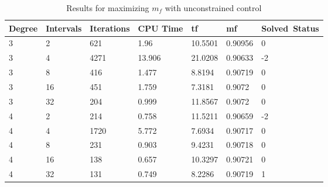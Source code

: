 \documentclass[]{article}
\begin{document}
\begin{table}
	\begin{tabular}{lllllll}
		Degree & Intervals & Iterations & CPU Time & tf & mf & Solved\ Status \\ 
		\hline 
		3 & 2 & 621 & 1.96 & 10.5501 & 0.90956 & 0 \\ 
		3 & 4 & 4271 & 13.906 & 21.0208 & 0.90633 & -2 \\ 
		3 & 8 & 416 & 1.477 & 8.8194 & 0.90719 & 0 \\ 
		3 & 16 & 451 & 1.759 & 7.3181 & 0.9072 & 0 \\ 
		3 & 32 & 204 & 0.999 & 11.8567 & 0.9072 & 0 \\ 
		4 & 2 & 214 & 0.758 & 11.5211 & 0.90659 & -2 \\ 
		4 & 4 & 1720 & 5.772 & 7.6934 & 0.90717 & 0 \\ 
		4 & 8 & 231 & 0.903 & 9.4231 & 0.90718 & 0 \\ 
		4 & 16 & 138 & 0.657 & 10.3297 & 0.90721 & 0 \\ 
		4 & 32 & 131 & 0.749 & 8.2286 & 0.90719 & 1 \\ 
		\hline 
	\end{tabular}
	\caption{Results for maximizing \(m_f\) with unconstrained control}
	\label{table:2}
\end{table}
\FloatBarrier
\end{document}
